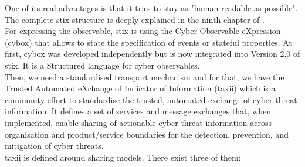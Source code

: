 \documentclass{eplmastersthesis}
\begin{document}
 One of its real advantages is that it tries to stay as "human-readable as possible". The complete \gls{stix} structure is deeply explained in the ninth chapter of \cite{barnum2012standardizing}.\\
 For expressing the observable, \gls{stix} is using the Cyber Observable eXpression (\gls{cybox})\cite{barnum2012cybox} that allows to state the specification of events or stateful properties. At first, \gls{cybox} was developed independently but is now integrated into Version 2.0 of \gls{stix}. It is a Structured language for cyber observables.\\
Then, we need a standardised transport mechanism and for that, we have the Trusted Automated eXchange of Indicator of Information (\gls{taxii}) \cite{connolly2014trusted, TAXIIProjectWeb} which is a community effort to standardise the trusted, automated exchange of cyber threat information. It defines a set of services and message exchanges that, when implemented, enable sharing of actionable cyber threat information across organisation and product/service boundaries for the detection, prevention, and mitigation of cyber threats.\\
\gls{taxii} is defined around sharing models. There exist three of them:
\end{document}
